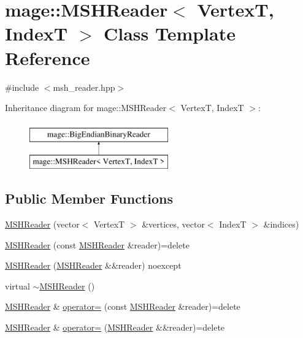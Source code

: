 \hypertarget{classmage_1_1_m_s_h_reader}{}\section{mage\+:\+:M\+S\+H\+Reader$<$ VertexT, IndexT $>$ Class Template Reference}
\label{classmage_1_1_m_s_h_reader}


{\ttfamily \#include $<$msh\+\_\+reader.\+hpp$>$}

Inheritance diagram for mage\+:\+:M\+S\+H\+Reader$<$ VertexT, IndexT $>$\+:\begin{figure}[H]
\begin{center}
\leavevmode
\includegraphics[height=2.000000cm]{classmage_1_1_m_s_h_reader}
\end{center}
\end{figure}
\subsection*{Public Member Functions}
\begin{DoxyCompactItemize}
\item 
\hyperlink{classmage_1_1_m_s_h_reader_af1254630a9770015c7b62d88eb5251bb}{M\+S\+H\+Reader} (vector$<$ VertexT $>$ \&vertices, vector$<$ IndexT $>$ \&indices)
\item 
\hyperlink{classmage_1_1_m_s_h_reader_aa33b8f059752b9aa321e8d227fe811bd}{M\+S\+H\+Reader} (const \hyperlink{classmage_1_1_m_s_h_reader}{M\+S\+H\+Reader} \&reader)=delete
\item 
\hyperlink{classmage_1_1_m_s_h_reader_accf271938e9a389e7940a20352b60c0c}{M\+S\+H\+Reader} (\hyperlink{classmage_1_1_m_s_h_reader}{M\+S\+H\+Reader} \&\&reader) noexcept
\item 
virtual \hyperlink{classmage_1_1_m_s_h_reader_a6e1f882fa81362f744f438a1f992b182}{$\sim$\+M\+S\+H\+Reader} ()
\item 
\hyperlink{classmage_1_1_m_s_h_reader}{M\+S\+H\+Reader} \& \hyperlink{classmage_1_1_m_s_h_reader_abbe36c0fcfbf0c909a45f974c34ecc3a}{operator=} (const \hyperlink{classmage_1_1_m_s_h_reader}{M\+S\+H\+Reader} \&reader)=delete
\item 
\hyperlink{classmage_1_1_m_s_h_reader}{M\+S\+H\+Reader} \& \hyperlink{classmage_1_1_m_s_h_reader_a0f014d780eaa5477aa7206db51fede2f}{operator=} (\hyperlink{classmage_1_1_m_s_h_reader}{M\+S\+H\+Reader} \&\&reader)=delete
\end{DoxyCompactItemize}
